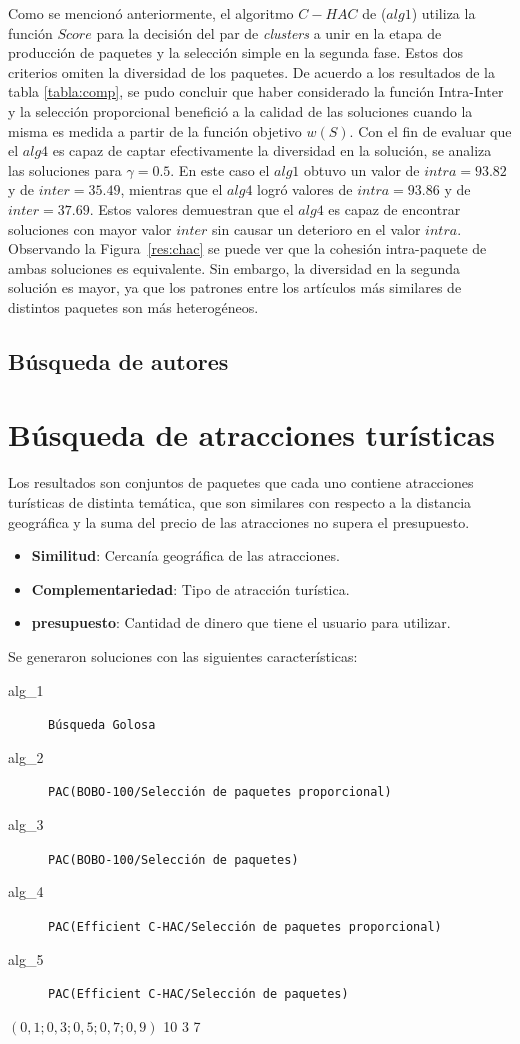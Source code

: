 Como se mencionó anteriormente, el algoritmo $C-HAC$ de \cite{compositeRetrival} ($alg1$) utiliza la función $Score$ para la decisión del par de {\em clusters} a unir en la etapa de producción de paquetes y la selección simple en la segunda fase. Estos dos criterios omiten la diversidad de los paquetes. De acuerdo a los resultados de la tabla \ref{tabla:comp}, se pudo concluir que haber considerado la función Intra-Inter y la selección proporcional benefició a la calidad de las soluciones cuando la misma es medida a partir de la función objetivo $w(S)$. Con el fin de evaluar que el $alg4$ es capaz de captar efectivamente la diversidad en la solución, se analiza las soluciones para $\gamma=0.5$. En este caso el $alg1$ obtuvo un valor de $intra=93.82$ y de $inter=35.49$, mientras que el $alg4$ logró valores de $intra=93.86$ y de $inter=37.69$. Estos valores demuestran que el $alg4$ es capaz de encontrar soluciones con mayor valor $inter$ sin causar un deterioro en el valor $intra$. Observando la Figura~\ref{res:chac} se puede ver que la cohesión intra-paquete de ambas soluciones es equivalente. Sin embargo, la diversidad en la segunda solución es mayor, ya que los patrones entre los artículos más similares de distintos paquetes son más heterogéneos. 

\subsection{Búsqueda de autores}
\section{Búsqueda de atracciones turísticas}\label{res:busAtracciones}
Los resultados son conjuntos de paquetes que cada uno contiene atracciones turísticas de distinta temática, que son similares con respecto a la distancia geográfica y la suma del precio de las atracciones no supera el presupuesto.
\begin{itemize}
  \item \textbf{Similitud}: Cercanía geográfica de las atracciones.
  \item \textbf{Complementariedad}: Tipo de atracción turística.
  \item \textbf{presupuesto}: Cantidad de dinero que tiene el usuario para utilizar.
\end{itemize}
Se generaron soluciones con las siguientes características:\\

\SolucionBudget
{}
{
\begin{description}
	\item[alg\_1] \texttt{Búsqueda Golosa}
	\item[alg\_2] \texttt{PAC(BOBO-100/Selección de paquetes proporcional)}
	\item[alg\_3] \texttt{PAC(BOBO-100/Selección de paquetes)}
	\item[alg\_4] \texttt{PAC(Efficient C-HAC/Selección de paquetes proporcional)}
	\item[alg\_5] \texttt{PAC(Efficient C-HAC/Selección de paquetes)}
\end{description}
}
{$(0,1; 0,3; 0,5; 0,7; 0,9)$}
{10}
{3}
{7}

